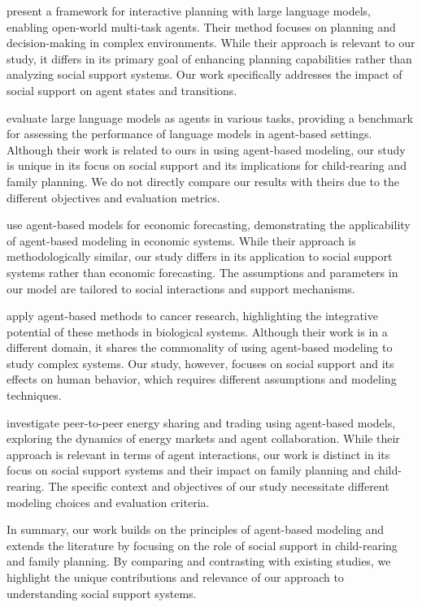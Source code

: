 \documentclass{article} %
\begin{document}
\citet{wang2023describe} present a framework for interactive planning with large language models, enabling open-world multi-task agents. Their method focuses on planning and decision-making in complex environments. While their approach is relevant to our study, it differs in its primary goal of enhancing planning capabilities rather than analyzing social support systems. Our work specifically addresses the impact of social support on agent states and transitions.

\citet{liu2023agentbench} evaluate large language models as agents in various tasks, providing a benchmark for assessing the performance of language models in agent-based settings. Although their work is related to ours in using agent-based modeling, our study is unique in its focus on social support and its implications for child-rearing and family planning. We do not directly compare our results with theirs due to the different objectives and evaluation metrics.

\citet{poledna2023economic} use agent-based models for economic forecasting, demonstrating the applicability of agent-based modeling in economic systems. While their approach is methodologically similar, our study differs in its application to social support systems rather than economic forecasting. The assumptions and parameters in our model are tailored to social interactions and support mechanisms.

\citet{west2023agent} apply agent-based methods to cancer research, highlighting the integrative potential of these methods in biological systems. Although their work is in a different domain, it shares the commonality of using agent-based modeling to study complex systems. Our study, however, focuses on social support and its effects on human behavior, which requires different assumptions and modeling techniques.

\citet{zhou2023peer} investigate peer-to-peer energy sharing and trading using agent-based models, exploring the dynamics of energy markets and agent collaboration. While their approach is relevant in terms of agent interactions, our work is distinct in its focus on social support systems and their impact on family planning and child-rearing. The specific context and objectives of our study necessitate different modeling choices and evaluation criteria.

In summary, our work builds on the principles of agent-based modeling and extends the literature by focusing on the role of social support in child-rearing and family planning. By comparing and contrasting with existing studies, we highlight the unique contributions and relevance of our approach to understanding social support systems.
\end{document}
